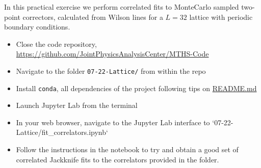 In this practical exercise we perform correlated fits to
MonteCarlo sampled two-point correctors,
calculated from Wilson lines for a $L=32$ lattice with periodic boundary conditions.

\begin{itemize}
      \item Close the code repository, \href{https://github.com/JointPhysicsAnalysisCenter/MTHS-Code}{https://github.com/JointPhysicsAnalysisCenter/MTHS-Code}
      \item Navigate to the folder \texttt{07-22-Lattice/} from within the repo
      \item Install \texttt{conda}, all dependencies of the project following tips on \href{https://github.com/JointPhysicsAnalysisCenter/MTHS-Code}{README.md}
      \item Launch Jupyter Lab from the terminal
      \item In your web browser, navigate to the Jupyter Lab interface to `07-22-Lattice/fit_correlators.ipynb`
      \item Follow the instructions in the notebook to try and obtain a good set of correlated Jackknife fits to the correlators provided in the folder.
\end{itemize}